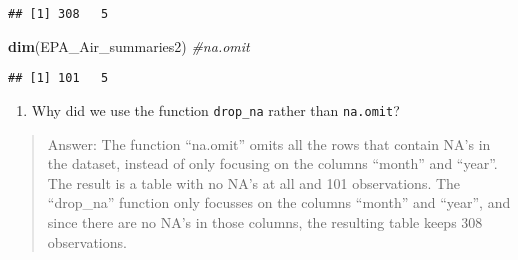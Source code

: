 \documentclass[
]{article}
\newenvironment{Shaded}{\begin{snugshade}}{\end{snugshade}}
\newcommand{\CommentTok}[1]{\textcolor[rgb]{0.56,0.35,0.01}{\textit{#1}}}
\newcommand{\KeywordTok}[1]{\textcolor[rgb]{0.13,0.29,0.53}{\textbf{#1}}}
\newcommand{\NormalTok}[1]{#1}
\providecommand{\tightlist}{%
  \setlength{\itemsep}{0pt}\setlength{\parskip}{0pt}}
\begin{document}
\begin{verbatim}
## [1] 308   5
\end{verbatim}

\begin{Shaded}
\begin{Highlighting}[]
\KeywordTok{dim}\NormalTok{(EPA_Air_summaries2) }\CommentTok{#na.omit}
\end{Highlighting}
\end{Shaded}

\begin{verbatim}
## [1] 101   5
\end{verbatim}

\begin{enumerate}
\def\labelenumi{\arabic{enumi}.}
\setcounter{enumi}{13}
\tightlist
\item
  Why did we use the function \texttt{drop\_na} rather than
  \texttt{na.omit}?
\end{enumerate}

\begin{quote}
Answer: The function ``na.omit'' omits all the rows that contain NA's in
the dataset, instead of only focusing on the columns ``month'' and
``year''. The result is a table with no NA's at all and 101
observations. The ``drop\_na'' function only focusses on the columns
``month'' and ``year'', and since there are no NA's in those columns,
the resulting table keeps 308 observations.
\end{quote}
\end{document}
